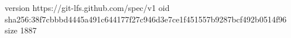 version https://git-lfs.github.com/spec/v1
oid sha256:38f7cbbbd4445a491c644177f27c946d3e7ce1f451557b9287bcf492b0514f96
size 1887
